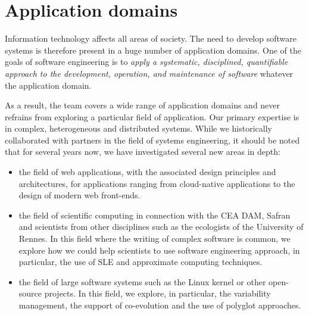 








\section{Application domains}
\label{diverse:domain}
Information technology affects all areas of society. The need to develop software systems is therefore present in a huge  number of application domains. One of the goals of software engineering is to \textit{apply a systematic, disciplined, quantifiable approach to the development, operation, and maintenance of software} whatever the application domain.

As a result, the team covers a wide range of application domains and never refrains from exploring a particular field of application.
Our primary expertise is in complex, heterogeneous and distributed systems. While we historically collaborated with partners in the field of systems engineering, it should be noted that for several years now, we have investigated several new areas in depth:
\begin{itemize}
\item the field of web applications, with the associated design principles and architectures, for applications ranging from cloud-native applications to the design of modern web front-ends.
\item the field of scientific computing in connection with the CEA DAM, Safran and scientists from other disciplines such as the ecologists of the University of Rennes. In this field where the writing of complex software is common, we explore how we could help scientists to use software engineering approach, in particular, the use of SLE and approximate computing techniques.
\item the field of large software systems such as the Linux kernel or other open-source projects. In this field, we explore, in particular, the variability management, the support of co-evolution and the use of polyglot approaches. 

\end{itemize} 





